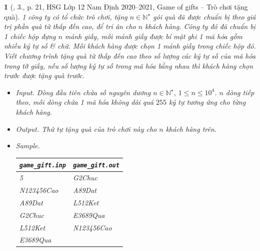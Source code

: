 \documentclass{article}
\newtheorem{baitoan}{}
\begin{document}
\begin{baitoan}[\cite{Trung_HSG_THPT_Tin}, 3., p. 21, HSG Lớp 12 Nam Định 2020--2021, Game of gifts -- Trò chơi tặng quà]
	1 công ty có tổ chức trò chơi, tặng $n\in\mathbb{N}^\star$ gói quà đã được chuẩn bị theo giá trị phần quà từ thấp đến cao, để tri ân cho $n$ khách hàng. Công ty đó đã chuẩn bị 1 chiếc hộp đựng $n$ mảnh giấy, mỗi mảnh giấy được bí mật ghi 1 mã hóa gồm nhiều ký tự số \& chữ. Mỗi khách hàng được chọn 1 mảnh giấy trong chiếc hộp đó. Viết chương trình tặng quà từ thấp đến cao theo số lượng các ký tự số của mã hóa trong tờ giấy, nếu số lượng ký tự số trong mã hóa bằng nhau thì khách hàng chọn trước được tặng quà trước.
	\begin{itemize}
		\item {\sf Input.} Dòng đầu tiên chứa số nguyên dương $n\in\mathbb{N}^\star$, $1\le n\le10^4$. $n$ dòng tiếp theo, mỗi dòng chứa 1 mã hóa không dài quá $255$ ký tự tương ứng cho từng khách hàng.
		\item {\sf Output.} Thứ tự tặng quà của trò chơi này cho $n$ khách hàng trên.
		\item {\sf Sample.}
		\begin{table}[H]
			\centering
			\begin{tabular}{|l|l|}
				\hline
				\verb|game_gift.inp| & \verb|game_gift.out| \\
				\hline
				5 & G2Chuc \\
				N123456Cao & A89Dat \\
				A89Dat & L512Ket \\
				G2Chuc & E3689Qua \\
				L512Ket & N123456Cao \\
				E3689Qua &  \\
				\hline
			\end{tabular}
		\end{table}
	\end{itemize}
\end{baitoan}
\end{document}
